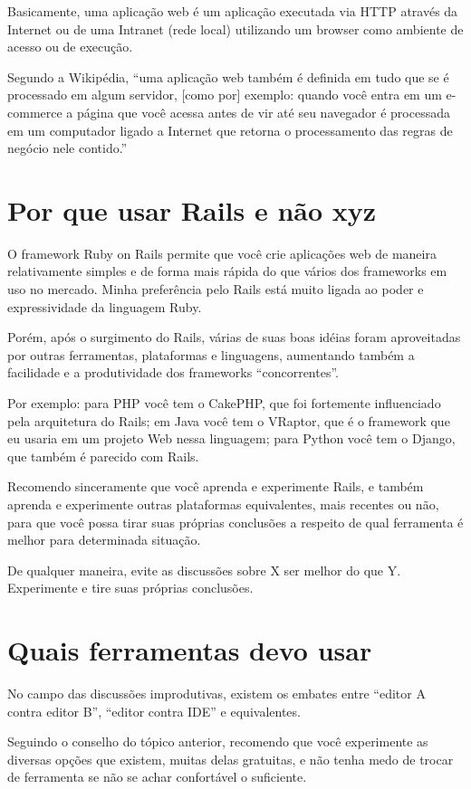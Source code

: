 \documentclass[12pt]{book} %
\begin{document}
Basicamente, uma aplicação web é um aplicação executada via HTTP através da Internet ou de uma Intranet (rede local) utilizando um browser como ambiente de acesso ou de execução.

Segundo a Wikipédia, “uma aplicação web também é definida em tudo que se é processado em algum servidor, [como por] exemplo: quando você entra em um e-commerce a página que você acessa antes de vir até seu navegador é processada em um computador ligado a Internet que retorna o processamento das regras de negócio nele contido.”

\section{Por que usar Rails e não xyz}

O framework Ruby on Rails permite que você crie aplicações web de maneira relativamente simples e de forma mais rápida do que vários dos frameworks em uso no mercado. Minha preferência pelo Rails está muito ligada ao poder e expressividade da linguagem Ruby.

Porém, após o surgimento do Rails, várias de suas boas idéias foram aproveitadas por outras ferramentas, plataformas e linguagens, aumentando também a facilidade e a produtividade dos frameworks “concorrentes”.

Por exemplo: para PHP você tem o CakePHP, que foi fortemente influenciado pela arquitetura do Rails; em Java você tem o VRaptor, que é o framework que eu usaria em um projeto Web nessa linguagem; para Python você tem o Django, que também é parecido com Rails.

Recomendo sinceramente que você aprenda e experimente Rails, e também aprenda e experimente outras plataformas equivalentes, mais recentes ou não, para que você possa tirar suas próprias conclusões a respeito de qual ferramenta é melhor para determinada situação. 

De qualquer maneira, evite as discussões sobre X ser melhor do que Y. Experimente e tire suas próprias conclusões.

\section{Quais ferramentas devo usar}

No campo das discussões improdutivas, existem os embates entre “editor A contra editor B”, “editor contra IDE” e equivalentes.

Seguindo o conselho do tópico anterior, recomendo que você experimente as diversas opções que existem, muitas delas gratuitas, e não tenha medo de trocar de ferramenta se não se achar confortável o suficiente.
\end{document}
